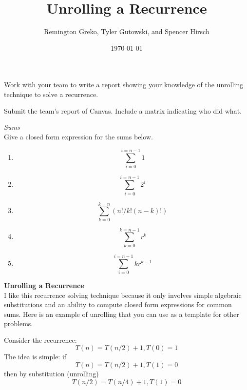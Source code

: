 \documentclass{article}
\begin{document}
\title{\textbf{Unrolling a Recurrence}}
\author{Remington Greko, Tyler Gutowski, and Spencer Hirsch}
\date{\today}

\maketitle

\noindent Work with your team to write a report showing your knowledge of
the unrolling technique to solve a recurrence.

\smallskip

\noindent Submit the team's report of Canvas. Include a matrix indicating
who did what.

\noindent \textit{Sums}\\
\noindent Give a closed form expression for the sums below.

\begin{enumerate}
    \item \begin{equation}
            \sum_{i=0}^{i=n-1}1
          \end{equation}
    \item \begin{equation}
            \sum_{i=0}^{i=n-1}2^i
          \end{equation}
    \item \begin{equation}
            \sum_{k=0}^{k=n}(n!/k!(n-k)!)
          \end{equation}
    \item \begin{equation}
            \sum_{k=0}^{k=n-1}r^k
          \end{equation}
    \item \begin{equation}
            \sum_{i=0}^{i=n-1}kr^{k-1}
          \end{equation}
\end{enumerate}

\noindent \textbf{Unrolling a Recurrence}\\

\noindent I like this recurrence solving technique because it only involves
simple algebraic substitutions and an ability to compute closed form expressions
for common sums. Here is an example of unrolling that you can use as a template
for other problems.

Consider the recurrence:
\[ T(n) = T(n/2) + 1, T(0) = 1 \]
The idea is simple: if
\[ T(n) = T(n/2) + 1, T(1) = 0 \]
then by substitution (unrolling)
\[ T(n/2) = T(n/4) + 1, T(1) = 0 \]
\end{document}
